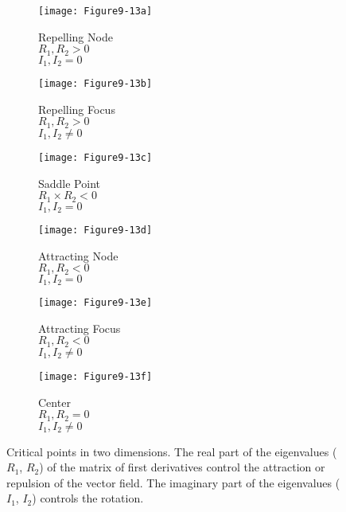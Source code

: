 \begin{figure}[htb]
	\begin{subfigure}[h]{0.32\linewidth}
		\texttt{[image: Figure9-13a]}
		\captionsetup{justification=centering}
		\caption*{Repelling Node\\$R_1, R_2 > 0$\\$I_1, I_2 = 0$}
		\label{fig:Figure9-13a}
	\end{subfigure}
	\hfill
	\begin{subfigure}[h]{0.32\linewidth}
		\texttt{[image: Figure9-13b]}
		\captionsetup{justification=centering}
		\caption*{Repelling Focus\\$R_1, R_2 > 0$\\$I_1, I_2 \neq 0$}
		\label{fig:Figure9-13b}
	\end{subfigure}
	\hfill
	\begin{subfigure}[h]{0.32\linewidth}
		\texttt{[image: Figure9-13c]}
		\captionsetup{justification=centering}
		\caption*{Saddle Point\\$R_1 \times R_2 < 0$\\$I_1, I_2 = 0$}
		\label{fig:Figure9-13c}
	\end{subfigure}
	\hfill
		\begin{subfigure}[h]{0.32\linewidth}
		\texttt{[image: Figure9-13d]}
		\captionsetup{justification=centering}
		\caption*{Attracting Node\\$R_1, R_2 < 0$\\$I_1, I_2 = 0$}
		\label{fig:Figure9-13d}
	\end{subfigure}
	\hfill
	\begin{subfigure}[h]{0.32\linewidth}
		\texttt{[image: Figure9-13e]}
		\captionsetup{justification=centering}
		\caption*{Attracting Focus\\$R_1, R_2 < 0$\\$I_1, I_2 \neq 0$}
		\label{fig:Figure9-13e}
	\end{subfigure}
	\hfill
	\begin{subfigure}[h]{0.32\linewidth}
		\texttt{[image: Figure9-13f]}
		\captionsetup{justification=centering}
		\caption*{Center\\$R_1, R_2 = 0$\\$I_1, I_2 \neq 0$}
		\label{fig:Figure9-13f}
	\end{subfigure}
	\caption{Critical points in two dimensions. The real part of the eigenvalues ($R_1$, $R_2$) of the matrix of first derivatives control the attraction or repulsion of the vector field. The imaginary part of the eigenvalues ($I_1$, $I_2$) controls the rotation.}\label{fig:Figure9-13}
\end{figure}

